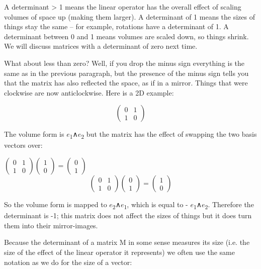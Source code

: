 \documentclass[oneside,english]{amsbook}
\numberwithin{section}{chapter}
\theoremstyle{plain}
\theoremstyle{definition}
\begin{document}
A determinant \textgreater{} 1 means the linear operator has the overall
effect of scaling volumes of space up (making them larger). A
determinant of 1 means the sizes of things stay the same -- for example,
rotations have a determinant of 1. A determinant between 0 and 1 means
volumes are scaled down, so things shrink. We will discuss matrices with
a determinant of zero next time.

What about less than zero? Well, if you drop the minus sign everything
is the same as in the previous paragraph, but the presence of the minus
sign tells you that the matrix has also reflected the space, as if in a
mirror. Things that were clockwise are now anticlockwise. Here is a 2D
example:

\[\begin{pmatrix}
	0 & 1 \\
	1 & 0
\end{pmatrix}\]

The volume form is $e$\textsubscript{1}∧$e$\textsubscript{2} but
the matrix has the effect of swapping the two basis vectors over:

\(\begin{pmatrix}
	0 & 1 \\
	1 & 0
\end{pmatrix}\begin{pmatrix}
	1 \\
	0
\end{pmatrix} = \begin{pmatrix}
	0 \\
	1
\end{pmatrix}\) \(
\)\[\begin{pmatrix}
	0 & 1 \\
	1 & 0
\end{pmatrix}\begin{pmatrix}
	0 \\
	1
\end{pmatrix} = \begin{pmatrix}
	1 \\
	0
\end{pmatrix}\]

So the volume form is mapped to
$e$\textsubscript{2}∧$e$\textsubscript{1}, which is equal to -
$e$\textsubscript{1}∧$e$\textsubscript{2}. Therefore the
determinant is -1; this matrix does not affect the sizes of things but
it does turn them into their mirror-images.

Because the determinant of a matrix M in some sense measures its size
(i.e. the size of the effect of the linear operator it represents) we
often use the same notation as we do for the size of a vector:
\end{document}
